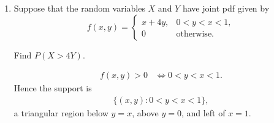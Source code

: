 \documentclass[12pt]{article} %
\newcommand{\Red}{\color{Red}}
\begin{document}
\begin{enumerate}
\begin{enumerate}[label=2.\arabic*]
{\begin{align*}
        \mathbb E[X]
        &=\int_{0}^{1}\int_{x}^{2-x} x\cdot 6x^2y dy dx
        = \frac{3}{5},\\[6pt]
        \mathbb E[Y]
        &=\int_{0}^{1}\int_{x}^{2-x} y\cdot 6x^2y dy dx
        = \frac{16}{15},\\[6pt]
        \mathbb E[XY]
        &=\int_{0}^{1}\int_{x}^{2-x} xy\cdot 6x^2y dy dx
        = \frac{22}{35}.
        \end{align*}
        \begin{align*}
        \operatorname{Cov}(X,Y)
        &=\frac{22}{35}-\left(\frac{3}{5}\right)\left(\frac{16}{15}\right)
        =\frac{22}{35}-\frac{16}{25}
        =-\frac{2}{175}.
        \end{align*}
        }
	\end{enumerate}
\newpage
\item Suppose that the random variables $X$ and $Y$ have joint pdf given by
	\begin{equation*}
			f(x,y)=\begin{cases}
			x+4y , & 0<y<x<1,\\
			0 & \text{otherwise}.
			\end{cases}
	\end{equation*}

Find $P(X>4Y)$.

 {\Red
        \begin{align*}
        f(x,y)>0 &\iff 0<y<x<1.
        \end{align*}
        Hence the support is
        \begin{align*}
        \{(x,y): 0<y<x<1\},
        \end{align*}
        a triangular region below $y=x$, above $y=0$, and left of $x=1$.
        \begin{center}
        \end{center}
        }


\end{enumerate}
\end{document}
